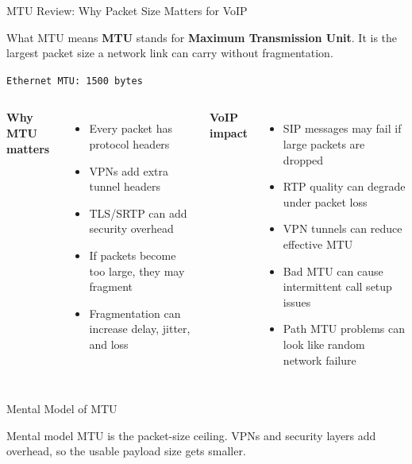 \documentclass[aspectratio=169]{beamer}
\begin{document}
\begin{frame}{MTU Review: Why Packet Size Matters for VoIP}
\small

\begin{block}{What MTU means}
\textbf{MTU} stands for \textbf{Maximum Transmission Unit}. It is the largest packet size a network link can carry without fragmentation.
\end{block}

\vspace{0.2cm}

\begin{center}
\texttt{Ethernet MTU: 1500 bytes}
\end{center}

\vspace{0.2cm}

\begin{columns}[T]

\textbf{Why MTU matters}

\begin{itemize}
    \item Every packet has protocol headers
    \item VPNs add extra tunnel headers
    \item TLS/SRTP can add security overhead
    \item If packets become too large, they may fragment
    \item Fragmentation can increase delay, jitter, and loss
\end{itemize}


\textbf{VoIP impact}

\begin{itemize}
    \item SIP messages may fail if large packets are dropped
    \item RTP quality can degrade under packet loss
    \item VPN tunnels can reduce effective MTU
    \item Bad MTU can cause intermittent call setup issues
    \item Path MTU problems can look like random network failure
\end{itemize}

\end{columns}

\end{frame}

\begin{frame}{Mental Model of MTU}
\begin{alertblock}{Mental model}
MTU is the packet-size ceiling. VPNs and security layers add overhead, so the usable payload size gets smaller.
\end{alertblock}

\end{frame}
\end{document}
